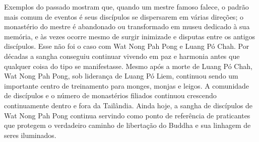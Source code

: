 Exemplos do passado mostram que, quando um mestre famoso falece, o
padrão mais comum de eventos é seus discípulos se dispersarem em várias
direções; o monastério do mestre é abandonado ou transformado em museu
dedicado à sua memória, e às vezes ocorre mesmo de surgir inimizade e
disputas entre os antigos discípulos. Esse não foi o caso com Wat Nong
Pah Pong e Luang Pó Chah. Por décadas a sangha conseguiu continuar
vivendo em paz e harmonia antes que qualquer coisa do tipo se
manifestasse. Mesmo após a morte de Luang Pó Chah, Wat Nong Pah Pong,
sob liderança de Luang Pó Liem, continuou sendo um importante centro de
treinamento para monges, monjas e leigos. A comunidade de discípulos e o
número de monastérios filiados continuou crescendo continuamente dentro
e fora da Tailândia. Ainda hoje, a sangha de discípulos de Wat Nong Pah
Pong continua servindo como ponto de referência de praticantes que
protegem o verdadeiro caminho de libertação do Buddha e sua linhagem de
seres iluminados.

